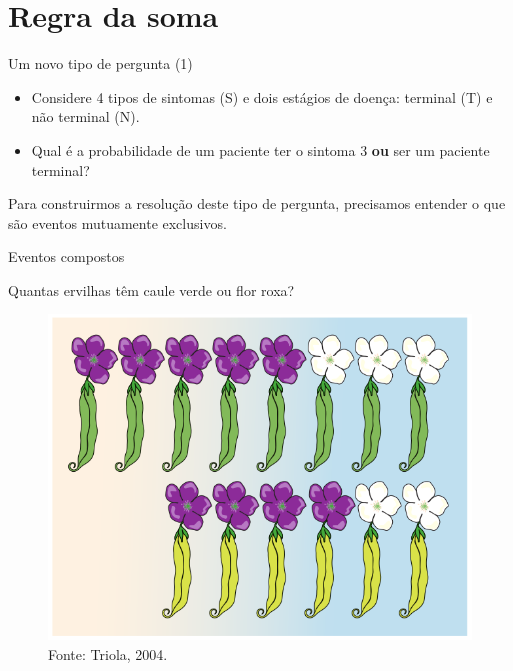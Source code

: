 \documentclass{beamer}
\begin{document}
\section{Regra da soma}


\begin{frame}{Um novo tipo de pergunta (1)}
  \begin{example}
    \begin{itemize}
    \item Considere 4 tipos de sintomas (S) e dois estágios de doença:
      terminal (T) e não terminal (N).

    \item Qual é a probabilidade de um paciente ter o sintoma 3
      \alert{{\bf ou}} ser um paciente terminal?

    \end{itemize}
  \end{example}

  Para construirmos a resolução deste tipo de pergunta, precisamos
  entender o que são eventos mutuamente exclusivos.
\end{frame}

\begin{frame}{Eventos compostos}
  \begin{example}
    Quantas ervilhas têm caule verde \alert{ou} flor roxa?
  \end{example}
  \begin{figure}
    \centering
    \includegraphics[height=0.6\textheight]{Prob_I/ervilhas-genetica}
    \caption{Fonte: Triola, 2004.}
  \end{figure}
\end{frame}
\end{document}
